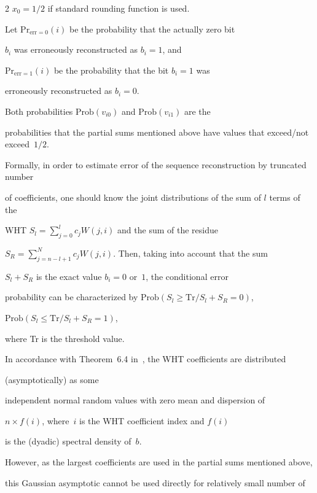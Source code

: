 \begin{multicols}{2}
$x_0=1/2$ if  standard rounding function is used.



Let $\mathrm{Pr}_{\mathrm{err}=0}(i)$ be the probability that the actually zero bit

$b_i$ was erroneously reconstructed as $b_i=1$, and

$\mathrm{Pr}_{\mathrm{err}=1}(i)$ be the probability that the bit $b_i=1$ was

erroneously reconstructed as $b_i=0$.



Both probabilities $\mathrm{Prob}\left(v_{i0}\right)$ and $\mathrm{Prob}\left(v_{i1}\right)$ are the

probabilities that the partial sums mentioned above have values that exceed/not exceed~$1/2$.



Formally, in order to estimate error of the sequence reconstruction by truncated number 

of coefficients, one should know the joint distributions of the sum of  $l$ terms  of the 

WHT $S_l = \sum\limits_{j=0}^{l} c_j W(j,i)$ and the sum of the residue 

$S_R =  \sum\limits_{j=n-l+1}^{N} c_j W(j,i)$. Then, taking into account that the sum 

$S_l + S_R $ is the exact value $b_i=0$ or~$1$,  the conditional error 

probability can be characterized by  $\mathrm{Prob}\left(S_l\ge \mathrm{Tr}/S_l +S_R=0\right)$, 

$\mathrm{Prob}\left(S_l\le \mathrm{Tr}/S_l +S_R=1\right)$, 

where Tr is the threshold value.



In accordance with Theorem~6.4 in~\cite{4-fr}, the WHT coefficients are distributed 

(asymptotically) as some

independent normal random values with zero mean and dispersion of

$n\times f(i)$, where~$i$ is the WHT coefficient index and $f(i)$

is the (dyadic) spectral density of~$b$.



However, as the largest coefficients are used in the partial sums mentioned above, 

this Gaussian  asymptotic cannot be used directly for relatively small number of 


\end{multicols}
